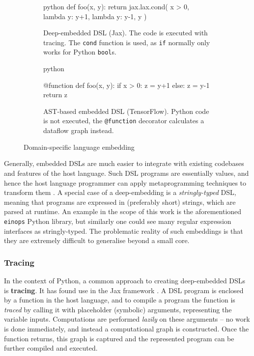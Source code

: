 \begin{figure}
\centering
\begin{subfigure}{.4\textwidth}
  \centering
  \begin{cminted}{python}
def foo(x, y):
  return jax.lax.cond(
    x > 0, 
    lambda y: y+1, 
    lambda y: y-1, 
    y
  )
  \end{cminted}
  \caption{Deep-embedded DSL (Jax). The code is executed with tracing. The \texttt{cond} function is used, as \texttt{if} normally only works for Python \texttt{bool}s.}
\end{subfigure} \quad %
\begin{subfigure}{.4\textwidth}
  \centering
    \begin{cminted}{python}

@function
def foo(x, y):
  if x > 0: z = y+1
  else:     z = y-1
  return z

    \end{cminted}
      \caption{AST-based embedded DSL (TensorFlow). Python code is not executed, the \texttt{@function} decorator calculates a dataflow graph instead.}
\end{subfigure}
\caption{Domain-specific language embedding}
\label{fig:embeddings}
\end{figure}

Generally, embedded DSLs are much easier to integrate with existing codebases and features of the host language.
Such DSL programs are essentially values, and hence the host language programmer can apply metaprogramming techniques to transform them \cite{atkey2009unembedding}. 
A special case of a deep-embedding is a \textit{stringly-typed} DSL, meaning that programs are expressed in (preferably short) strings, which are parsed at runtime. An example in the scope of this work is the aforementioned \texttt{einops} Python library, but similarly one could see many regular expression interfaces as stringly-typed. The problematic reality of such embeddings is that they are extremely difficult to generalise beyond a small core.

\subsubsection{Tracing} \label{tracing}

In the context of Python, a common approach to creating deep-embedded DSLs is \textbf{tracing}. It has found use in the Jax framework \cite{frostig2018compiling}. A DSL program is enclosed by a function in the host language, and to compile a program the function is \textit{traced} by calling it with placeholder (symbolic) arguments, representing the variable inputs. Computations are performed \textit{lazily} on these arguments -- no work is done immediately, and instead a computational graph is constructed. Once the function returns, this graph is captured and the represented program can be further compiled and executed.

